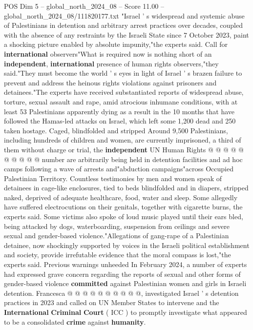 \begin{textsample}{POS Dim 5 – global\_north\_2024\_08 – Score 11.00 – global\_north\_2024\_08/111820177.txt}  \label{ex:f5_pos_377}
"Israel ' s widespread and systemic abuse of Palestinians in detention and arbitrary arrest practices over decades, coupled with the absence of any restraints by the Israeli State since 7 October 2023, paint a shocking picture enabled by absolute impunity,"the experts said.
Call for \textbf{international} observers"What is required now is nothing short of an \textbf{independent}, \textbf{international} presence of human rights observers,"they said."They must become the world ' s eyes in light of Israel ' s brazen failure to prevent and address the heinous rights violations against prisoners and detainees."The experts have received substantiated reports of widespread abuse, torture, sexual assault and rape, amid atrocious inhumane conditions, with at least 53 Palestinians apparently dying as a result in the 10 months that have followed the Hamas-led attacks on Israel, which left some 1,200 dead and 250 taken hostage.
Caged, blindfolded and stripped Around 9,500 Palestinians, including hundreds of children and women, are currently imprisoned, a third of them without charge or trial, the \textbf{independent} UN Human Rights @ @ @ @ @ @ @ @ @ @ number are arbitrarily being held in detention facilities and ad hoc camps following a wave of arrests and"abduction campaigns"across Occupied Palestinian Territory.
Countless testimonies by men and women speak of detainees in cage-like enclosures, tied to beds blindfolded and in diapers, stripped naked, deprived of adequate healthcare, food, water and sleep.
Some allegedly have suffered electrocutions on their genitals, together with cigarette burns, the experts said.
Some victims also spoke of loud music played until their ears bled, being attacked by dogs, waterboarding, suspension from ceilings and severe sexual and gender-based violence."Allegations of gang-rape of a Palestinian detainee, now shockingly supported by voices in the Israeli political establishment and society, provide irrefutable evidence that the moral compass is lost,"the experts said.
Previous warnings unheeded In February 2024, a number of experts had expressed grave concern regarding the reports of sexual and other forms of gender-based violence \textbf{committed} against Palestinian women and girls in Israeli detention.
Francesca @ @ @ @ @ @ @ @ @ @, investigated Israel ' s detention practices in 2023 and called on UN Member States to intervene and the \textbf{International} \textbf{Criminal} \textbf{Court} ( ICC ) to promptly investigate what appeared to be a consolidated \textbf{crime} against \textbf{humanity}.

\end{textsample}
